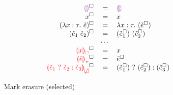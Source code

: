 \newcommand{\erasesToRow}[2]{\erase{#1} & = & #2}
\begin{figure}[htbp]
  \[\begin{array}{rcl}
    \erasesToRow{\ECEHole}{\EEHole} \\
    \erasesToRow{x}{x} \\
    \erasesToRow{(\ECLam{x}{\TMV}{\ECMV})}{\ELam{x}{\TMV}{(\erase{\ECMV})}} \\
    \erasesToRow{(\ECAp{\ECMV_1}{\ECMV_2})}{\EAp{(\erase{\ECMV_1})}{(\erase{\ECMV_2})}} \\
    & \cdots & \\
    \erasesToRow{\ECUnbound{x}}{x} \\
    \erasesToRow{\ECInconType{\ECMV}}{\erase{\ECMV}} \\
    \erasesToRow{\ECInconBr{\ECMV_1}{\ECMV_2}{\ECMV_3}}{\EIf{(\erase{\ECMV_1})}{(\erase{\ECMV_2})}{(\erase{\ECMV_3})}} \\
  \end{array}\]
  \caption{Mark erasure (selected)}
  \label{fig:calculus-mark-erasure}
\end{figure}
